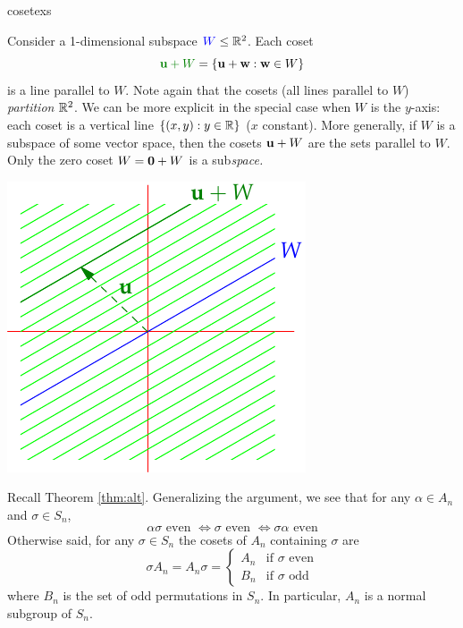 \begin{examples}{}{cosetexs}
\begin{enumerate}
	  
		\begin{minipage}[t]{0.65\linewidth}\vspace{0pt}
			\item\label{ex:cosetsubspace} Consider a 1-dimensional subspace $\textcolor{blue}{W}\le\mathbb{R}^2$. Each coset
			\[
				\textcolor{Green}{\vu+W}=\{\vu+\vw:\vw\in W\}
			\]
			is a line parallel to $W$. Note again that the cosets (all lines parallel to $W$) \emph{partition} $\mathbb{R}^2$.\smallbreak
			We can be more explicit in the special case when $W$ is the $y$-axis: each coset is a vertical line $\{(x,y):y\in\mathbb{R}\}$ ($x$ constant).\smallbreak
			More generally, if $W$ is a subspace of some vector space, then the cosets ${\mathbf{u}}+W$ are the sets parallel to $W$. Only the zero coset $W=\mathbf{0}+W$ is a sub\emph{space.}
		\end{minipage}
		\hfill
		\begin{minipage}[t]{0.33\linewidth}\vspace{0pt}
			\flushright\includegraphics[scale=0.93]{coset-coset}
		\end{minipage}
	
	
		\item Recall Theorem \ref{thm:alt}. Generalizing the argument, we see that for any $\alpha\in A_n$ and $\sigma\in S_n$,
		\[
			\alpha\sigma\text{ even }
			\iff \sigma\text{ even }
			\iff \sigma\alpha\text{ even}
		\]
		Otherwise said, for any $\sigma\in S_n$ the cosets of $A_n$ containing $\sigma$ are
		\[
			\sigma A_n=A_n\sigma=
			\begin{cases}
				A_n&\text{if $\sigma$ even}\\
				B_n&\text{if $\sigma$ odd}
			\end{cases}
		\]
		where $B_n$ is the set of odd permutations in $S_n$. In particular, $A_n$ is a normal subgroup of $S_n$.
	\end{enumerate}
\end{examples}

